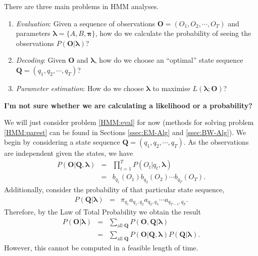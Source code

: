 \documentclass[12pt]{article}
\begin{document}
There are three main problems in HMM analyses.
\begin{enumerate}
\item \emph{Evaluation}: Given a sequence of observations $\bm{O}=(O_1,O_2,\cdots,O_T)$ and parameters $\bm{\lambda}=\{A,B,\bm{\pi}\}$, how do we calculate the probability of seeing the observations $P(\bm{O}|\bm{\lambda})$? \label{HMM:eval}
\item \emph{Decoding}: Given $\bm{O}$ and $\bm{\lambda}$, how do we choose an ``optimal'' state sequence $\bm{Q}=(q_1,q_2,\cdots,q_T)$? \label{HMM:dec}
\item \emph{Parameter estimation}: How do we choose $\bm{\lambda}$ to maximise $L(\bm{\lambda};\bm{O})$? \label{HMM:parest}
  
\end{enumerate}

\textbf{I'm not sure whether we are calculating a likelihood or a probability?}

We will just consider problem \ref{HMM:eval} for now (methods for solving problem \ref{HMM:parest} can be found in Sections \ref{ssec:EM-Alg} and \ref{ssec:BW-Alg}). We begin by considering a state sequence $\bm{Q}=(q_1,q_2,\cdots,q_T)$. As the observations are independent given the states, we have
\begin{eqnarray*}
  P(\bm{O}|\bm{Q},\bm{\lambda})&=&\prod_{t=1}^TP(O_t|q_t,\bm{\lambda})\\
  &=&b_{q_1}(O_1)b_{q_2}(O_2)\cdots b_{q_T}(O_T).
\end{eqnarray*}
Additionally, consider the probability of that particular state sequence,
\begin{eqnarray*}
  P(\bm{Q}|\bm{\lambda})&=&\pi_{q_1}a_{q_1,q_2}a_{q_2,q_3}\cdots a_{q_{T-1},q_T}.
\end{eqnarray*}
Therefore, by the Law of Total Probability we obtain the result
\begin{eqnarray*}
  P(\bm{O}|\bm{\lambda})&=&\sum_{\text{all }\bm{Q}}P(\bm{O},\bm{Q}|\bm{\lambda})\\
  &=&\sum_{\text{all }\bm{Q}}P(\bm{O}|\bm{Q},\bm{\lambda})P(\bm{Q}|\bm{\lambda}).
\end{eqnarray*}
However, this cannot be computed in a feasible length of time.
\end{document}
